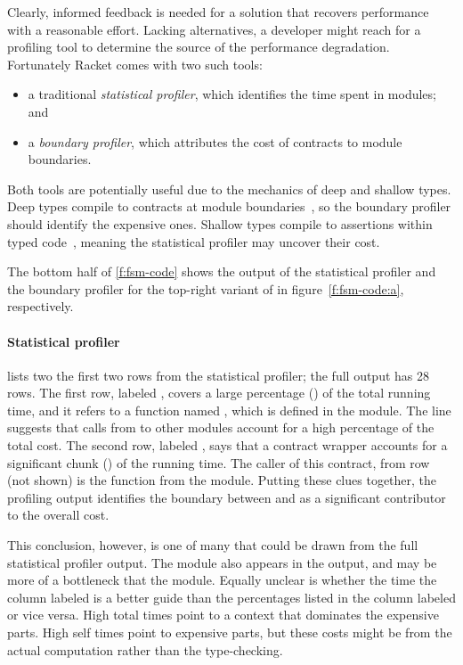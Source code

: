 Clearly, informed feedback is needed for a solution that recovers performance
with a reasonable effort. Lacking alternatives, a developer might reach for a
profiling tool to determine the source of the performance
degradation. Fortunately Racket comes with two such tools: 
\begin{itemize}

\item a traditional \emph{statistical profiler}, which identifies the time spent
 in modules; and

\item a \emph{boundary profiler}, which  attributes the cost of contracts to
 module boundaries.
 
\end{itemize}
Both tools are potentially useful due to the mechanics of deep and shallow types.
Deep types compile to contracts at module boundaries~\cite{tf-popl-2008}, so
the boundary profiler should identify the expensive ones. 
Shallow types compile to assertions within typed code~\cite{glfd-pj-2022},
meaning the statistical profiler may uncover their cost. 

The bottom half of \cref{f:fsm-code} shows the output of the statistical
profiler and the boundary profiler for the top-right variant of  in
figure~\ref{f:fsm-code:a}, respectively.

\paragraph{Statistical profiler}  lists two the
first two rows from the statistical profiler; the full output has 28 rows.  The
first row, labeled \code{[17]}, covers a large percentage () of the
total running time, and it refers to a function named , which is
defined in the  module. The line suggests that calls from
 to other modules account for a high percentage of the total cost.
The second row, labeled \code{[24]}, says that a contract wrapper accounts for a
significant chunk () of the running time.  The caller of this
contract, from row \code{[19]} (not shown) is the function 
from the  module.  Putting these clues together, the profiling output
identifies the boundary between  and  as a significant
contributor to the overall cost. 

This conclusion, however, is one of many that could be drawn from the full
statistical profiler output.  The  module also appears in the output,
and may be more of a bottleneck that the  module.  Equally unclear is
whether the time the column labeled  is a better guide than the
percentages listed in the column labeled  or vice versa.  High total
times point to a context that dominates the expensive parts.  High self times
point to expensive parts, but these costs might be from the actual computation
rather than the type-checking.


